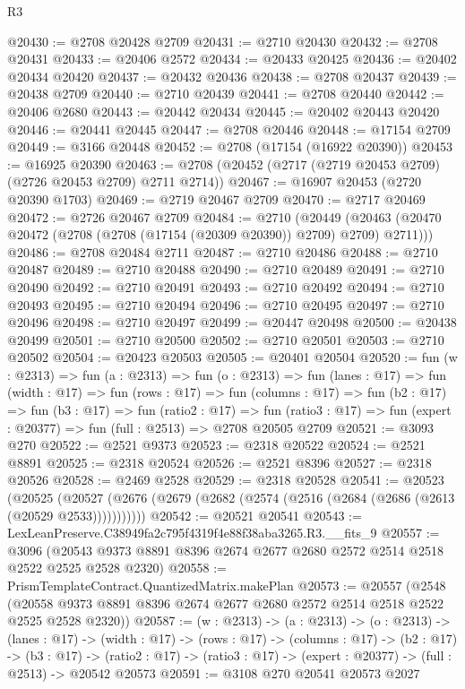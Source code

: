 \begin{lexlean}{R3}
\begin{coremodule}
@20430 := @2708 @20428 @2709
@20431 := @2710 @20430
@20432 := @2708 @20431
@20433 := @20406 @2572
@20434 := @20433 @20425
@20436 := @20402 @20434 @20420
@20437 := @20432 @20436
@20438 := @2708 @20437
@20439 := @20438 @2709
@20440 := @2710 @20439
@20441 := @2708 @20440
@20442 := @20406 @2680
@20443 := @20442 @20434
@20445 := @20402 @20443 @20420
@20446 := @20441 @20445
@20447 := @2708 @20446
@20448 := @17154 @2709
@20449 := @3166 @20448
@20452 := @2708 (@17154 (@16922 @20390))
@20453 := @16925 @20390
@20463 := @2708 (@20452 (@2717 (@2719 @20453 @2709) (@2726 @20453 @2709) @2711 @2714))
@20467 := @16907 @20453 (@2720 @20390 @1703)
@20469 := @2719 @20467 @2709
@20470 := @2717 @20469
@20472 := @2726 @20467 @2709
@20484 := @2710
    (@20449 (@20463 (@20470 @20472 (@2708 (@2708 (@17154 (@20309 @20390)) @2709) @2709) @2711)))
@20486 := @2708 @20484 @2711
@20487 := @2710 @20486
@20488 := @2710 @20487
@20489 := @2710 @20488
@20490 := @2710 @20489
@20491 := @2710 @20490
@20492 := @2710 @20491
@20493 := @2710 @20492
@20494 := @2710 @20493
@20495 := @2710 @20494
@20496 := @2710 @20495
@20497 := @2710 @20496
@20498 := @2710 @20497
@20499 := @20447 @20498
@20500 := @20438 @20499
@20501 := @2710 @20500
@20502 := @2710 @20501
@20503 := @2710 @20502
@20504 := @20423 @20503
@20505 := @20401 @20504
@20520 := fun (w : @2313) =>
  fun (a : @2313) =>
  fun (o : @2313) =>
  fun (lanes : @17) =>
  fun (width : @17) =>
  fun (rows : @17) =>
  fun (columns : @17) =>
  fun (b2 : @17) =>
  fun (b3 : @17) =>
  fun (ratio2 : @17) =>
  fun (ratio3 : @17) => fun (expert : @20377) => fun (full : @2513) => @2708 @20505 @2709
@20521 := @3093 @270
@20522 := @2521 @9373
@20523 := @2318 @20522
@20524 := @2521 @8891
@20525 := @2318 @20524
@20526 := @2521 @8396
@20527 := @2318 @20526
@20528 := @2469 @2528
@20529 := @2318 @20528
@20541 := @20523
    (@20525 (@20527 (@2676 (@2679 (@2682 (@2574 (@2516 (@2684 (@2686 (@2613 (@20529 @2533)))))))))))
@20542 := @20521 @20541
@20543 := LexLeanPreserve.C38949fa2c795f4319f4e88f38aba3265.R3.__fits_9
@20557 := @3096
    (@20543 @9373 @8891 @8396 @2674 @2677 @2680 @2572 @2514 @2518 @2522 @2525 @2528 @2320)
@20558 := PrismTemplateContract.QuantizedMatrix.makePlan
@20573 := @20557
    (@2548 (@20558 @9373 @8891 @8396 @2674 @2677 @2680 @2572 @2514 @2518 @2522 @2525 @2528 @2320))
@20587 := (w : @2313) ->
  (a : @2313) ->
  (o : @2313) ->
  (lanes : @17) ->
  (width : @17) ->
  (rows : @17) ->
  (columns : @17) ->
  (b2 : @17) ->
  (b3 : @17) ->
  (ratio2 : @17) -> (ratio3 : @17) -> (expert : @20377) -> (full : @2513) -> @20542 @20573
@20591 := @3108 @270 @20541 @20573 @2027

\end{coremodule}
\end{lexlean}
